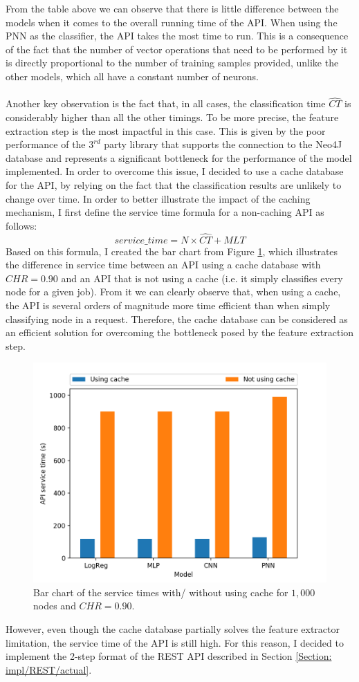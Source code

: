 			From the table above we can observe that there is little difference between the models when it comes to the overall running time of the API. When using the PNN as the classifier, the API takes the most time to run. This is a consequence of the fact that the number of vector operations that need to be performed by it is directly proportional to the number of training samples provided, unlike the other models, which all have a constant number of neurons. 
			\\ \\
			Another key observation is the fact that, in all cases, the classification time $\hat{CT}$ is considerably higher than all the other timings. To be more precise, the feature extraction step is the most impactful in this case. This is given by the poor performance of the $3^{rd}$ party library that supports the connection to the Neo4J database and represents a significant bottleneck for the performance of the model implemented. In order to overcome this issue, I decided to use a cache database for the API, by relying on the fact that the classification  results are unlikely to change over time. In order to better illustrate the impact of the caching mechanism, I first define the service time formula for a non-caching API as follows:
			\begin{equation}
				service\_time = N \times \hat{CT} + MLT
			\end{equation}
			Based on this formula, I created the bar chart from Figure \ref{Fig: eval/service-time/bringing/bar}, which illustrates the difference in service time between an API using a cache database with $CHR=0.90$ and an API that is not using a cache (i.e. it simply classifies every node for a given job). From it we can clearly observe that, when using a cache, the API is several orders of magnitude more time efficient than when simply classifying node in a request. Therefore, the cache database can be considered as an efficient solution for overcoming the bottleneck posed by the feature extraction step.  
			\begin{figure}[H]
				\centering
				\includegraphics[width=.7\textwidth]{graphics/service-time-hist}
				\caption{Bar chart of the service times with/ without using cache for $1,000$ nodes and $CHR=0.90$.}
				\label{Fig: eval/service-time/bringing/bar}
			\end{figure}
			However, even though the cache database partially solves the feature extractor limitation, the service time of the API is still high. For this reason, I decided to implement the 2-step format of the REST API described in Section \ref{Section: impl/REST/actual}.
